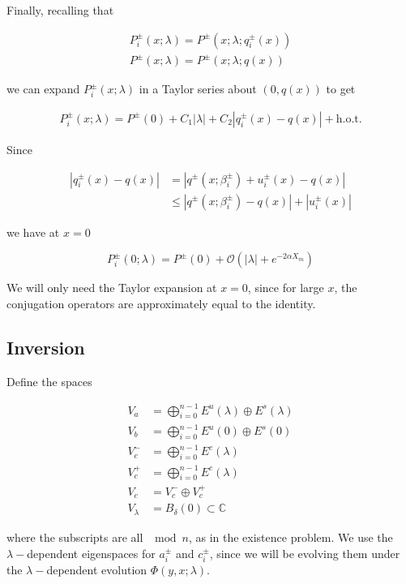 \documentclass[12pt]{article}
\def\C{{\mathbb C}}
\begin{document}
Finally, recalling that

\begin{align*}
P_i^\pm(x; \lambda) = P^\pm(x; \lambda; q_i^\pm(x)) \\
P^\pm(x; \lambda) = P^\pm(x; \lambda; q(x))
\end{align*}

we can expand $P_i^\pm(x; \lambda)$ in a Taylor series about $(0, q(x))$ to get

\begin{align*}
P_i^\pm(x; \lambda) = P^\pm(0) + C_1 |\lambda| 
+ C_2| q_i^\pm(x) - q(x) | + \text{h.o.t.}
\end{align*}

Since 

\begin{align*}
| q_i^\pm(x) - q(x) | &= | q^\pm(x; \beta_i^\pm) + u_i^\pm(x) - q(x) | \\
&\leq |q^\pm(x; \beta_i^\pm) - q(x)| + |u_i^\pm(x)|
\end{align*}

we have at $x = 0$

\begin{equation}\label{PTaylor}
P_i^\pm(0; \lambda) = P^\pm(0) + \mathcal{O}(|\lambda| + e^{-2 \alpha X_m})
\end{equation}

We will only need the Taylor expansion at $x = 0$, since for large $x$, the conjugation operators are approximately equal to the identity.

\subsection{Inversion}

Define the spaces

\begin{align*}
V_a &= \bigoplus_{i=0}^{n-1} E^u(\lambda) \oplus E^s(\lambda) \\
V_b &= \bigoplus_{i=0}^{n-1} E^u(0) \oplus E^s(0) \\
V_c^- &= \bigoplus_{i=0}^{n-1} E^c(\lambda) \\
V_c^+ &= \bigoplus_{i=0}^{n-1} E^c(\lambda) \\
V_c &= V_c^- \oplus V_c^+ \\
V_\lambda &= B_\delta(0) \subset \C
\end{align*}

where the subscripts are all $\mod n$, as in the existence problem. We use the $\lambda-$dependent eigenspaces for $a_i^\pm$ and $c_i^\pm$, since we will be evolving them under the $\lambda-$dependent evolution $\Phi(y, x; \lambda)$.\\
\end{document}
